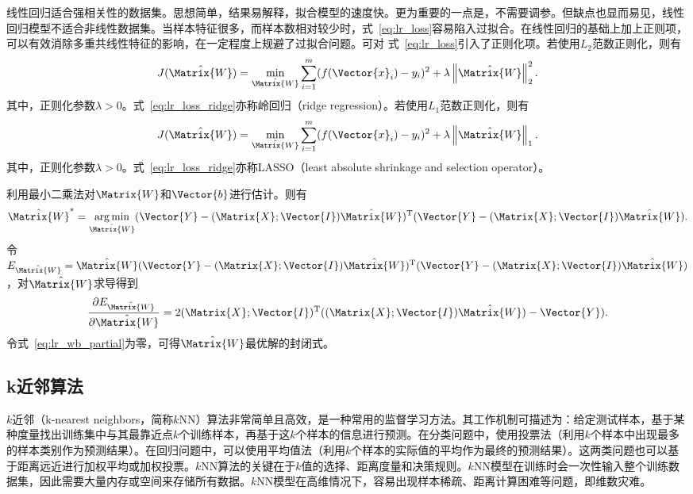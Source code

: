 线性回归适合强相关性的数据集。思想简单，结果易解释，拟合模型的速度快。更为重要的一点是，不需要调参。但缺点也显而易见，线性回归模型不适合非线性数据集。当样本特征很多，而样本数相对较少时，式~\ref{eq:lr_loss}容易陷入过拟合。在线性回归的基础上加上正则项，可以有效消除多重共线性特征的影响，在一定程度上规避了过拟合问题。可对
式~\ref{eq:lr_loss}引入了正则化项。若使用$L_2$范数正则化，则有
\begin{equation}
  \label{eq:lr_loss_ridge}
  J(\hat{\Matrix{W}})=\min_{\hat{\Matrix{W}}}\sum_{i=1}^{m}(f(\Vector{x}_i)-y_i)^2+\lambda\left\|\hat{\Matrix{W}}\right\|_2^2.
\end{equation}
其中，正则化参数$\lambda>0$。式~\ref{eq:lr_loss_ridge}亦称岭回归（ridge regression）。若使用$L_1$范数正则化，则有
\begin{equation}
  \label{eq:lr_loss_lasso}
  J(\hat{\Matrix{W}})=\min_{\hat{\Matrix{W}}}\sum_{i=1}^{m}(f(\Vector{x}_i)-y_i)^2+\lambda\left\|\hat{\Matrix{W}}\right\|_1.
\end{equation}
其中，正则化参数$\lambda>0$。式~\ref{eq:lr_loss_ridge}亦称LASSO（least absolute shrinkage and selection operator）。

利用最小二乘法对$\Matrix{W}$和$\Vector{b}$进行估计。则有
\begin{equation}
  \label{eq:lr_wb}
  \hat{\Matrix{W}}^*=\mathop{\arg\min}\limits_{\hat{\Matrix{W}}}(\Vector{Y}-(\Matrix{X};\Vector{I})\hat{\Matrix{W}})^{\text{T}}(\Vector{Y}-(\Matrix{X};\Vector{I})\hat{\Matrix{W}}).
\end{equation}
令$E_{\hat{\Matrix{W}}}={\hat{\Matrix{W}}}(\Vector{Y}-(\Matrix{X};\Vector{I})\hat{\Matrix{W}})^{\text{T}}(\Vector{Y}-(\Matrix{X};\Vector{I})\hat{\Matrix{W}})$，对$\hat{\Matrix{W}}$求导得到
\begin{equation}
  \label{eq:lr_wb_partial}
  \frac{\partial{E_{\hat{\Matrix{W}}}}}{\partial{\hat{\Matrix{W}}}}=2(\Matrix{X};\Vector{I})^{\text{T}}((\Matrix{X};\Vector{I})\hat{\Matrix{W}})-\Vector{Y}).
\end{equation}
令式~\ref{eq:lr_wb_partial}为零，可得$\hat{\Matrix{W}}$最优解的封闭式。

\subsection{k近邻算法}\label{sec:k近邻算法}

$k$近邻（k-nearest neighbors，简称$k$NN）算法非常简单且高效，是一种常用的监督学习方法。其工作机制可描述为：给定测试样本，基于某种度量找出训练集中与其最靠近点$k$个训练样本，再基于这$k$个样本的信息进行预测。在分类问题中，使用投票法（利用$k$个样本中出现最多的样本类别作为预测结果）。在回归问题中，可以使用平均值法（利用$k$个样本的实际值的平均作为最终的预测结果）。这两类问题也可以基于距离远近进行加权平均或加权投票。$k$NN算法的关键在于$k$值的选择、距离度量和决策规则。$k$NN模型在训练时会一次性输入整个训练数据集，因此需要大量内存或空间来存储所有数据。$k$NN模型在高维情况下，容易出现样本稀疏、距离计算困难等问题，即维数灾难。

